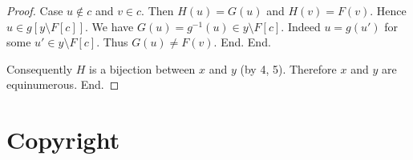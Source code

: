 \documentclass{article}
\begin{document}
\begin{forthel}
\begin{proof}
          Case $u \notin c$ and $v \in c$.
            Then $H(u) = G(u)$ and $H(v) = F(v)$.
            Hence $u \in g[y \setminus F[c]]$.
            We have $G(u) = g^{-1}(u) \in y \setminus F[c]$.
            Indeed $u = g(u')$ for some $u' \in y \setminus F[c]$.
            Thus $G(u) \neq F(v)$.
          End.
        End.

        Consequently $H$ is a bijection between $x$ and $y$ (by 4, 5).
        Therefore $x$ and $y$ are equinumerous.
      End.
    \end{proof}
  \end{forthel}

  \printbibliography

  \section*{Copyright}
  \doclicenseThis
\end{document}
